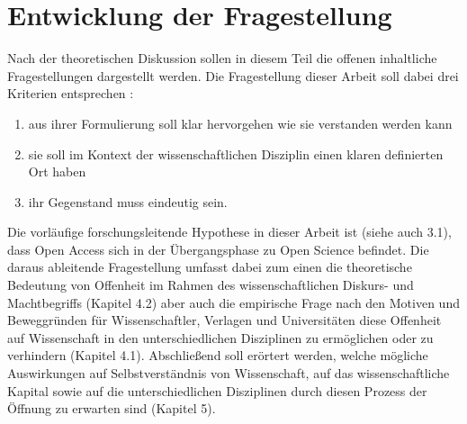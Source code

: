 \section{Entwicklung der Fragestellung}
Nach der theoretischen Diskussion sollen in diesem Teil die offenen inhaltliche Fragestellungen dargestellt werden.  Die Fragestellung dieser Arbeit soll dabei drei Kriterien entsprechen :
\begin{enumerate}
\item aus ihrer Formulierung soll klar hervorgehen wie sie verstanden werden kann
\item sie soll im Kontext der wissenschaftlichen Disziplin einen klaren definierten Ort haben 
\item ihr Gegenstand muss eindeutig sein.
\end{enumerate}
Die vorläufige forschungsleitende Hypothese in dieser Arbeit ist (siehe auch 3.1), dass Open Access sich in der Übergangsphase zu Open Science befindet. Die daraus ableitende Fragestellung umfasst dabei zum einen die theoretische Bedeutung von Offenheit im Rahmen des wissenschaftlichen Diskurs- und Machtbegriffs (Kapitel 4.2) aber auch die empirische Frage nach den Motiven und Beweggründen für Wissenschaftler, Verlagen und Universitäten diese Offenheit auf Wissenschaft in den unterschiedlichen Disziplinen zu ermöglichen oder zu verhindern (Kapitel 4.1). Abschließend soll erörtert werden, welche mögliche Auswirkungen auf Selbstverständnis von Wissenschaft, auf das wissenschaftliche Kapital sowie auf die unterschiedlichen Disziplinen durch diesen Prozess der Öffnung zu erwarten sind (Kapitel 5).
